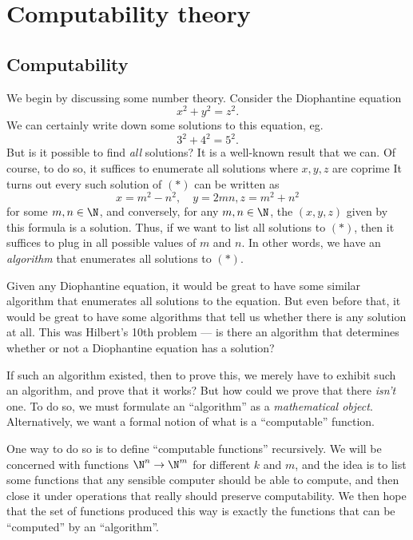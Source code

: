 \documentclass[a4paper]{article}
\begin{document}
\section{Computability theory}
\subsection{Computability}
We begin by discussing some number theory. Consider the Diophantine equation
\[
  x^2 + y^2 = z^2.\tag{$*$}
\]
We can certainly write down some solutions to this equation, eg.
\[
  3^2 + 4^2 = 5^2.
\]
But is it possible to find \emph{all} solutions? It is a well-known result that we can. Of course, to do so, it suffices to enumerate all solutions where $x, y, z$ are coprime It turns out every such solution of $(*)$ can be written as
\[
  x = m^2 - n^2,\quad y = 2mn, z = m^2 + n^2
\]
for some $m, n \in \N$, and conversely, for any $m, n \in \N$, the $(x, y, z)$ given by this formula is a solution. Thus, if we want to list all solutions to $(*)$, then it suffices to plug in all possible values of $m$ and $n$. In other words, we have an \emph{algorithm} that enumerates all solutions to $(*)$.

Given any Diophantine equation, it would be great to have some similar algorithm that enumerates all solutions to the equation. But even before that, it would be great to have some algorithms that tell us whether there is any solution at all. This was Hilbert's 10th problem --- is there an algorithm that determines whether or not a Diophantine equation has a solution?

If such an algorithm existed, then to prove this, we merely have to exhibit such an algorithm, and prove that it works? But how could we prove that there \emph{isn't} one. To do so, we must formulate an ``algorithm'' as a \emph{mathematical object}. Alternatively, we want a formal notion of what is a ``computable'' function.

One way to do so is to define ``computable functions'' recursively. We will be concerned with functions $\N^n \to \N^m$ for different $k$ and $m$, and the idea is to list some functions that any sensible computer should be able to compute, and then close it under operations that really should preserve computability. We then hope that the set of functions produced this way is exactly the functions that can be ``computed'' by an ``algorithm''.
\end{document}
